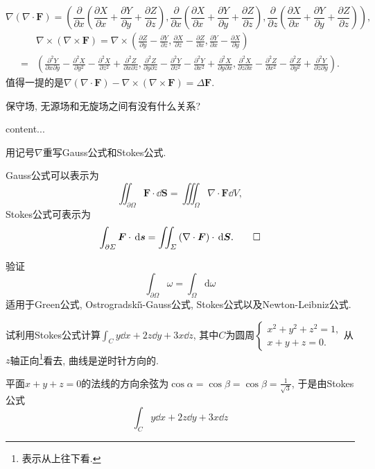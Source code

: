 \begin{quiza}
\begin{solution}
\[\nabla\left(\nabla\cdot\boldsymbol{F}\right)=\left(\frac{\partial}{\partial x}\left(\frac{\partial X}{\partial x}+\frac{\partial Y}{\partial y}+\frac{\partial Z}{\partial z}\right),\frac{\partial}{\partial x}\left(\frac{\partial X}{\partial x}+\frac{\partial Y}{\partial y}+\frac{\partial Z}{\partial z}\right),\frac{\partial}{\partial z}\left(\frac{\partial X}{\partial x}+\frac{\partial Y}{\partial y}+\frac{\partial Z}{\partial z}\right)\right),\]
\[\begin{split}
&\nabla\times\left(\nabla\times\boldsymbol{F}\right)=\nabla\times\left(\frac{\partial Z}{\partial y}-\frac{\partial Y}{\partial z},\frac{\partial X}{\partial z}-\frac{\partial Z}{\partial x},\frac{\partial Y}{\partial x}-\frac{\partial X}{\partial y}\right)\\=&\left(\frac{\partial^2Y}{\partial x\partial y}-\frac{\partial^2X}{\partial y^2}-\frac{\partial^2X}{\partial z^2}+\frac{\partial^2Z}{\partial x\partial z},\frac{\partial^2Z}{\partial y\partial z}-\frac{\partial^2Y}{\partial z^2}-\frac{\partial^2Y}{\partial x^2}+\frac{\partial^2X}{\partial y\partial x},\frac{\partial^2X}{\partial z\partial x}-\frac{\partial^2Z}{\partial x^2}-\frac{\partial^2Z}{\partial y^2}+\frac{\partial^2Y}{\partial z\partial y}\right).
\end{split}\]值得一提的是\(\nabla\left(\nabla\cdot\boldsymbol{F}\right)-\nabla\times\left(\nabla\times\boldsymbol{F}\right)=\Delta\boldsymbol{F}\).
\end{solution}
\woe 保守场, 无源场和无旋场之间有没有什么关系?
\begin{solution}
content...
\end{solution}
\woe 用记号\(\nabla\)重写Gauss公式和Stokes公式.
\begin{solution}
Gauss公式可以表示为\[\iint_{\partial \varOmega}\boldsymbol{F}\cdot\dd\boldsymbol{S}=\iiint_{\varOmega}\nabla\cdot\boldsymbol{F}\dd V,\]Stokes公式可表示为\[\int_{\partial\varSigma}\boldsymbol{F}\cdot\,\mathrm{d}\boldsymbol{s}=\iint_{\varSigma}\left(\nabla\cdot\boldsymbol{F}\right)\cdot\,\mathrm{d}\boldsymbol{S}.\qedhere\]
\end{solution}
\woe 验证\[\int_{\partial\varOmega}\omega=\int_{\varOmega}\mathrm{d}\omega\]适用于Green公式, Ostrogradski\v{\i}-Gauss公式, Stokes公式以及Newton-Leibniz公式.
\begin{solution}

\end{solution}
\woe 试利用Stokes公式计算\(\int_Cy\dd x+2z\dd y+3x\dd z\), 其中\(C\)为圆周\(\begin{cases}
x^2+y^2+z^2=1,\\x+y+z=0.
\end{cases}\)从\(z\)轴正向\footnote{表示从上往下看.}看去, 曲线是逆时针方向的.
\begin{solution}
平面\(x+y+z=0\)的法线的方向余弦为\(\cos\alpha=\cos\beta=\cos\beta=\frac{1}{\sqrt{3}}\), 于是由Stokes公式\[\int_Cy\dd x+2z\dd y+3x\dd z\]
\end{solution}
\end{quiza}
